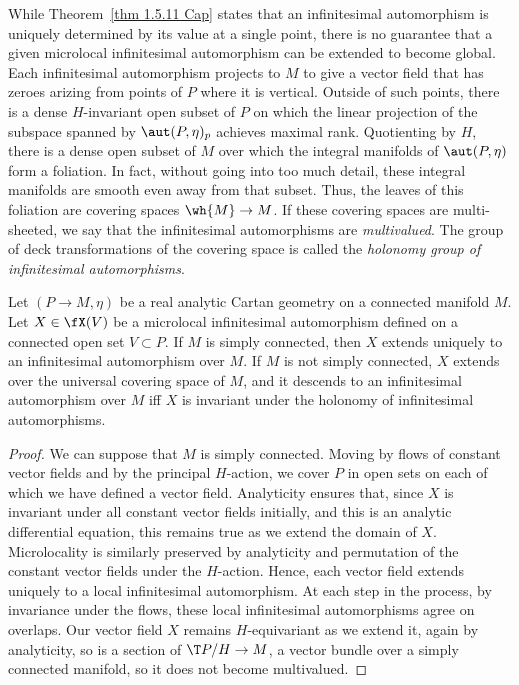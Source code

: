 While Theorem~\ref{thm 1.5.11 Cap} states that an infinitesimal automorphism is uniquely determined by its value at a single point, there is no guarantee that a given microlocal infinitesimal automorphism can be extended to become global. Each infinitesimal automorphism projects to $M$ to give a vector field that has zeroes arizing from points of $P$ where it is vertical. Outside of such points, there is a dense $H$-invariant open subset of $P$ on which the linear projection of the subspace spanned by $\aut(P,\eta)_p$ achieves maximal rank. Quotienting by $H$, there is a dense open subset of $M$ over which the integral manifolds of $\aut(P,\eta)$ form a foliation. In fact, without going into too much detail, these integral manifolds are smooth even away from that subset. Thus, the leaves of this foliation are covering spaces $\wh{M}\to M$. If these covering spaces are multi-sheeted, we say that the infinitesimal automorphisms are \emph{multivalued}. The group of deck transformations of the covering space is called the \emph{holonomy group of infinitesimal automorphisms}.

\begin{thm}
    Let $(P\to M,\eta)$ be a real analytic Cartan geometry on a connected manifold $M$. Let $X\in \fX(V)$ be a microlocal infinitesimal automorphism defined on a connected open set $V\subset P$. If $M$ is simply connected, then $X$ extends uniquely to an infinitesimal automorphism over $M$. If $M$ is not simply connected, $X$ extends over the universal covering space of $M$, and it descends to an infinitesimal automorphism over $M$ iff $X$ is invariant under the holonomy of infinitesimal automorphisms.
\end{thm}
\begin{proof}
    We can suppose that $M$ is simply connected. Moving by flows of constant vector fields and by the principal $H$-action, we cover $P$ in open sets on each of which we have defined a vector field. Analyticity ensures that, since $X$ is invariant under all constant vector fields initially, and this is an analytic differential equation, this remains true as we extend the domain of $X$. Microlocality is similarly preserved by analyticity and permutation of the constant vector fields under the $H$-action. Hence, each vector field extends uniquely to a local infinitesimal automorphism. At each step in the process, by invariance under the flows, these local infinitesimal automorphisms agree on overlaps. Our vector field $X$ remains $H$-equivariant as we extend it, again by analyticity, so is a section of $\T P\slash H\to M$, a vector bundle over a simply connected manifold, so it does not become multivalued.
\end{proof}

